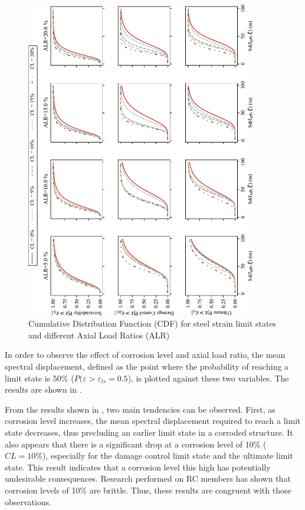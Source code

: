 \begin{figure}[htbp]
	\centering
	\includegraphics[width=0.9\textwidth]{VAC Thesis 2.0/Chapter-5/figs/CDF_summary.pdf}
	\caption{Cumulative Distribution Function (CDF) for steel strain limit states and different Axial Load Ratios (ALR)}
	\label{fig:CDF_strain_vs_ALR}
\end{figure}

In order to observe the effect of corrosion level and axial load ratio, the mean spectral displacement, defined as the point where the probability of reaching a limit state is 50\% ($P(\varepsilon>\varepsilon_{ls}=0.5$), is plotted against these two variables. The results are shown in .

From the results shown in , two main tendencies can be observed. First, as corrosion level increases, the mean spectral displacement required to reach a limit state decreases, thus precluding an earlier limit state in a corroded structure. It also appears that there is a significant drop at a corrosion level of 10\% ($CL=10\%$), especially for the damage control limit state and the ultimate limit state. This result indicates that a corrosion level this high has potentially undesirable consequences. Research performed on RC members has shown that corrosion levels of 10\% are brittle. Thus, these results are congruent with those observations.

